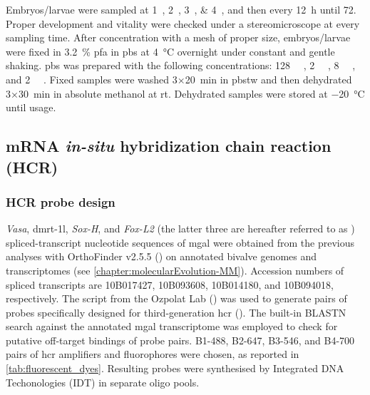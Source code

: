 Embryos/larvae were sampled at \qtylist{1;2;3;4}{\hpf}, and then every \qty{12}{\hour} until \qty{72}{\hpf}. Proper development and vitality were checked under a stereomicroscope at every sampling time. After concentration with a mesh of proper size, embryos/larvae were fixed in \qty{3.2}{\percent} \gls{pfa} in \gls{pbs} at \qty{4}{\degreeCelsius} overnight under constant and gentle shaking. \gls{pbs} was prepared with the following concentrations: \qty{128}{\milli\molar} , \qty{2}{\milli\molar} , \qty{8}{\milli\molar} , and \qty{2}{\milli\molar} . Fixed samples were washed 3×\qty{20}{min} in \gls{pbstw} and then dehydrated 3×\qty{30}{\minute} in absolute methanol at \gls{rt}. Dehydrated samples were stored at \qty{-20}{\degreeCelsius} until usage.

\subsection{mRNA \textit{in-situ} hybridization chain reaction (HCR)}
\subsubsection{HCR probe design}
\textit{Vasa}, \gls{dmrt-1l}, \textit{Sox-H}, and \textit{Fox-L2} (the latter three are hereafter referred to as ) spliced-transcript nucleotide sequences of \gls{mgal} were obtained from the previous analyses with OrthoFinder v2.5.5 () on annotated bivalve genomes and transcriptomes (see \cref{chapter:molecularEvolution-MM}). Accession numbers of spliced transcripts are 10B017427, 10B093608, 10B014180, and 10B094018, respectively. The  script from the Ozpolat Lab () was used to generate pairs of probes specifically designed for third-generation \gls{hcr} (). The built-in BLASTN search against the annotated \gls{mgal} transcriptome was employed to check for putative off-target bindings of probe pairs. B1-488, B2-647, B3-546, and B4-700 pairs of \gls{hcr} amplifiers and fluorophores were chosen, as reported in \cref{tab:fluorescent_dyes}. Resulting probes were synthesised by Integrated DNA Techonologies (IDT\texttrademark) in separate oligo pools.


